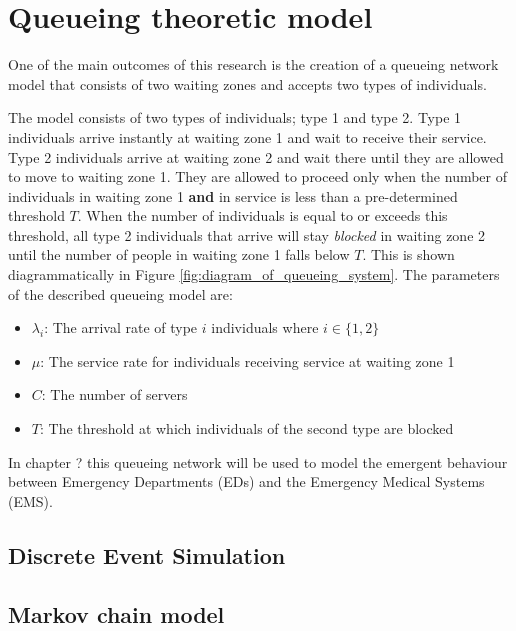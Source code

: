 \section{Queueing theoretic model}

One of the main outcomes of this research is the creation of a queueing network
model that consists of two waiting zones and accepts two types of individuals.



The model consists of two types of individuals; type 1 and type 2.
Type 1 individuals arrive instantly at waiting zone 1 and wait to receive their
service.
Type 2 individuals arrive at waiting zone 2 and wait there until they are
allowed to move to waiting zone 1.
They are allowed to proceed only when the number of
individuals in waiting zone 1 \textbf{and} in service is less than a
pre-determined threshold \(T\).
When the number of individuals is equal to or exceeds this threshold, all
type 2 individuals that arrive will stay \textit{blocked} in waiting zone 2
until the number of people in waiting zone 1 falls below \(T\).
This is shown diagrammatically in Figure \ref{fig:diagram_of_queueing_system}.
The parameters of the described queueing model are:

\begin{itemize}
    \item \(\lambda_i\): The arrival rate of type \(i\) individuals where
    \(i\in\{1, 2\}\)
    \item \(\mu\): The service rate for individuals receiving service at
    waiting zone 1
    \item \(C\): The number of servers
    \item \(T\): The threshold at which individuals of the second type are
    blocked
\end{itemize}

In chapter ?
this queueing network will be used to model the emergent behaviour between
Emergency Departments (EDs) and the Emergency Medical Systems (EMS).

\subsection{Discrete Event Simulation}

\subsection{Markov chain model}

